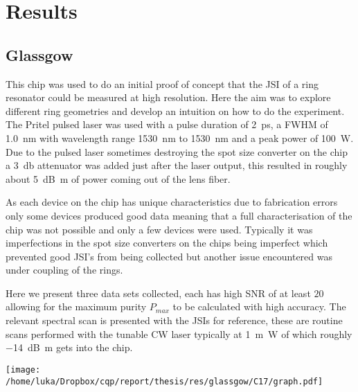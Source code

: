 \newpage
\section{Results}
\subsection{Glassgow}
This chip was used to do an initial proof of concept that the JSI of a ring resonator could be measured at high resolution. Here the aim was to explore different ring geometries and develop an intuition on how to do the experiment. The Pritel pulsed laser was used with a pulse duration of \SI{2}{\pico\second}, a FWHM of \SI{1.0}{\nano\meter} with wavelength range \SI{1530}{\nano\meter} to \SI{1530}{\nano\meter} and a peak power of \SI{100}{\watt}. Due to the pulsed laser sometimes destroying the spot size converter on the chip a \SI{3}{\decibel} attenuator was added just after the laser output, this resulted in roughly about \SI{5}{\deci\bel\m} of power coming out of the lens fiber.

As each device on the chip has unique characteristics due to fabrication errors only some devices produced good data meaning that a full characterisation of the chip was not possible and only a few devices were used. Typically it was imperfections in the spot size converters on the chips being imperfect which prevented good JSI's from being collected but another issue encountered was under coupling of the rings.

Here we present three data sets collected, each has high SNR of at least $20$ allowing for the maximum purity $P_{max}$ to be calculated with high accuracy. The relevant spectral scan is presented with the JSIs for reference, these are routine scans performed with the tunable CW laser typically at \SI{1}{\m\watt} of which roughly \SI{-14}{\deci\bel\m} gets into the chip. 

\begingroup
    \centering  
    \texttt{[image: /home/luka/Dropbox/cqp/report/thesis/res/glassgow/C17/graph.pdf]}
     \vspace{3pt} \label{c17_jsi}
\endgroup

